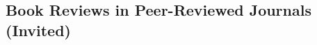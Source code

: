 \begin{itemize}






\end{itemize}




\subsection*{Book Reviews in Peer-Reviewed Journals (Invited)}


